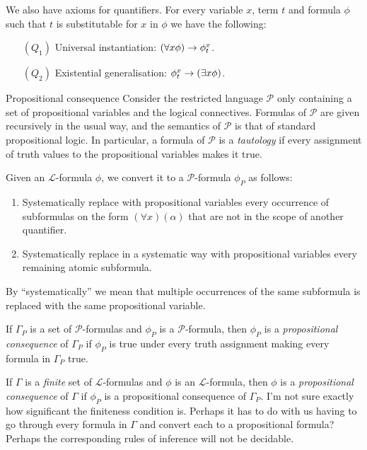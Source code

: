 \documentclass[article, a4paper, 11pt, oneside]{memoir}
\numberwithin{equation}{chapter}
\newcommand{\calP}{\mathcal{P}}
\newcommand{\calL}{\mathcal{L}}
\theoremstyle{nonumberplain}
\begin{document}
\begin{notelist}
    We also have axioms for quantifiers. For every variable $x$, term $t$ and formula $\phi$ such that $t$ is substitutable for $x$ in $\phi$ we have the following:
    \begin{enumerate}
        \item[$(Q_1)$] Universal instantiation: $(\forall x \phi) \rightarrow \phi^x_t$.
        \item[$(Q_2)$] Existential generalisation: $\phi^x_t \rightarrow (\exists x \phi)$.
    \end{enumerate}

    \item[Propositional consequence]
    Consider the restricted language $\calP$ only containing a set of propositional variables and the logical connectives. Formulas of $\calP$ are given recursively in the usual way, and the semantics of $\calP$ is that of standard propositional logic. In particular, a formula of $\calP$ is a \emph{tautology} if every assignment of truth values to the propositional variables makes it true.

    Given an $\calL$-formula $\phi$, we convert it to a $\calP$-formula $\phi_P$ as follows:
    \begin{enumerate}
        \item Systematically replace with propositional variables every occurrence of subformulas on the form $(\forall x)(\alpha)$ that are not in the scope of another quantifier.
        \item Systematically replace in a systematic way with propositional variables every remaining atomic subformula.
    \end{enumerate}
    By \enquote{systematically} we mean that multiple occurrences of the same subformula is replaced with the same propositional variable. 

    If $\Gamma_P$ is a set of $\calP$-formulas and $\phi_P$ is a $\calP$-formula, then $\phi_P$ is a \emph{propositional consequence} of $\Gamma_P$ if $\phi_P$ is true under every truth assignment making every formula in $\Gamma_P$ true.

    If $\Gamma$ is a \emph{finite} set of $\calL$-formulas and $\phi$ is an $\calL$-formula, then $\phi$ is a \emph{propositional consequence} of $\Gamma$ if $\phi_P$ is a propositional consequence of $\Gamma_P$. I'm not sure exactly how significant the finiteness condition is. Perhaps it has to do with us having to go through every formula in $\Gamma$ and convert each to a propositional formula? Perhaps the corresponding rules of inference will not be decidable.


\end{notelist}
\end{document}

